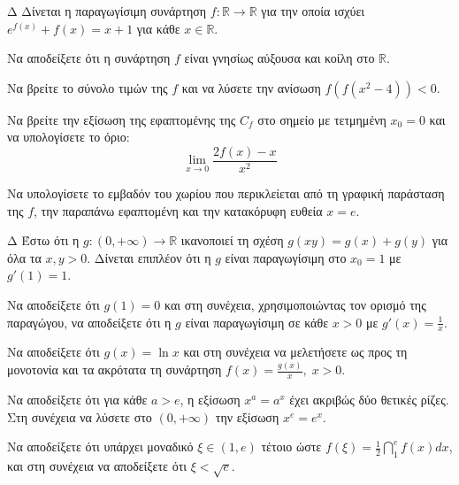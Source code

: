 \begin{thema}{Δ}
Δίνεται η παραγωγίσιμη συνάρτηση $f : \mathbb{R} \to \mathbb{R}$ για την οποία ισχύει $e^{f(x)} + f(x) = x + 1$ για κάθε $x \in \mathbb{R}$.
\begin{erwthma}
    \item Να αποδείξετε ότι η συνάρτηση $f$ είναι γνησίως αύξουσα και κοίλη στο $\mathbb{R}$.
    \item Να βρείτε το σύνολο τιμών της $f$ και να λύσετε την ανίσωση $\displaystyle f(f(x^2 - 4)) < 0$.
    \item Να βρείτε την εξίσωση της εφαπτομένης της $C_f$ στο σημείο με τετμημένη $x_0 = 0$ και να υπολογίσετε το όριο:
    \[ \lim_{x \to 0} \frac{2f(x) - x}{x^2} \]
    \item Να υπολογίσετε το εμβαδόν του χωρίου που περικλείεται από τη γραφική παράσταση της $f$, την παραπάνω εφαπτομένη και την κατακόρυφη ευθεία $x = e$.
\end{erwthma}
\end{thema}

\begin{thema}{Δ}
Έστω ότι η $g: (0, +\infty) \to \mathbb{R}$ ικανοποιεί τη σχέση $g(xy) = g(x) + g(y)$ για όλα τα $x, y > 0$. Δίνεται επιπλέον ότι η $g$ είναι παραγωγίσιμη στο $x_0 = 1$ με $g'(1) = 1$.
\begin{erwthma}
    \item Να αποδείξετε ότι $g(1) = 0$ και στη συνέχεια, χρησιμοποιώντας τον ορισμό της παραγώγου, να αποδείξετε ότι η $g$ είναι παραγωγίσιμη σε κάθε $x > 0$ με $\displaystyle g'(x) = \frac{1}{x}$.
    \item Να αποδείξετε ότι $g(x) = \ln x$ και στη συνέχεια να μελετήσετε ως προς τη μονοτονία και τα ακρότατα τη συνάρτηση $\displaystyle f(x) = \frac{g(x)}{x}, \; x > 0$.
    \item Να αποδείξετε ότι για κάθε $a > e$, η εξίσωση $x^a = a^x$ έχει ακριβώς δύο θετικές ρίζες. Στη συνέχεια να λύσετε στο $(0, +\infty)$ την εξίσωση $x^e = e^x$.
    \item Να αποδείξετε ότι υπάρχει μοναδικό $\xi \in (1, e)$ τέτοιο ώστε $\displaystyle f(\xi) = \frac{1}{2} \dint_1^e f(x) dx$, και στη συνέχεια να αποδείξετε ότι $\xi < \sqrt{e}$.
\end{erwthma}
\end{thema}

